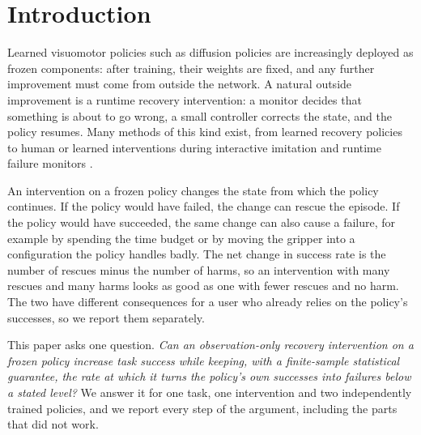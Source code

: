 \documentclass[preprint,12pt]{elsarticle}
\begin{document}
\section{Introduction}\label{sec:intro}

Learned visuomotor policies such as diffusion policies \cite{chi2023diffusion} are increasingly deployed as frozen components: after training, their weights are fixed, and any further improvement must come from outside the network. A natural outside improvement is a runtime recovery intervention: a monitor decides that something is about to go wrong, a small controller corrects the state, and the policy resumes. Many methods of this kind exist, from learned recovery policies \cite{reichlin2022manifold,cideron2023getback,vats2025recoverychaining} to human or learned interventions during interactive imitation \cite{ross2011dagger,kelly2019hgdagger,hoque2022thrifty} and runtime failure monitors \cite{agia2025unpacking,romer2025fiper,liu2023reflect,duan2025aha}.

An intervention on a frozen policy changes the state from which the policy continues. If the policy would have failed, the change can rescue the episode. If the policy would have succeeded, the same change can also cause a failure, for example by spending the time budget or by moving the gripper into a configuration the policy handles badly. The net change in success rate is the number of rescues minus the number of harms, so an intervention with many rescues and many harms looks as good as one with fewer rescues and no harm. The two have different consequences for a user who already relies on the policy's successes, so we report them separately.

This paper asks one question. \emph{Can an observation-only recovery intervention on a frozen policy increase task success while keeping, with a finite-sample statistical guarantee, the rate at which it turns the policy's own successes into failures below a stated level?} We answer it for one task, one intervention and two independently trained policies, and we report every step of the argument, including the parts that did not work.
\end{document}
